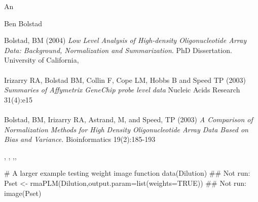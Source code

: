 \begin{Value}
An 
\end{Value}
\begin{Author}\relax
Ben Bolstad 
\end{Author}
\begin{References}\relax
Bolstad, BM (2004) \emph{Low Level Analysis of High-density
Oligonucleotide Array Data: Background, Normalization and
Summarization}. PhD Dissertation. University of California,
\\ \\ Irizarry RA, Bolstad BM, Collin F, Cope LM, Hobbs B and Speed
TP (2003) \emph{Summaries of Affymetrix GeneChip probe level data}
Nucleic Acids Research 31(4):e15
\\ \\ Bolstad, BM, Irizarry RA, Astrand, M, and Speed, TP (2003)
\emph{A Comparison of Normalization Methods for High Density
Oligonucleotide Array Data Based on Bias and Variance.}
Bioinformatics 19(2):185-193
\end{References}
\begin{SeeAlso}\relax
{},
, ,, 
\end{SeeAlso}
\begin{Examples}
\begin{ExampleCode}
# A larger example testing weight image function
data(Dilution)
## Not run: Pset <- rmaPLM(Dilution,output.param=list(weights=TRUE))
## Not run: image(Pset)
\end{ExampleCode}
\end{Examples}

